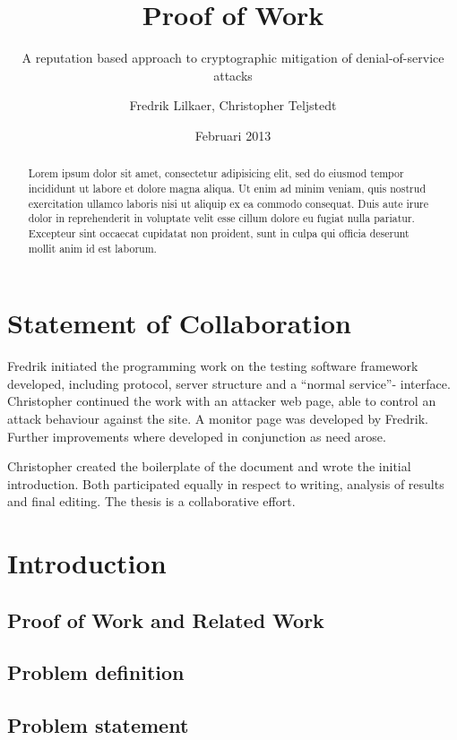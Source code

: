 \documentclass[a4paper,11pt]{kth-mag}
\title{Proof of Work}
\subtitle{A reputation based approach to cryptographic mitigation of denial-of-service attacks}
\author{Fredrik Lilkaer, Christopher Teljstedt}
\date{Februari 2013}
\begin{document}
\removepagenumbers
\maketitle
{}
\newpage
\begin{abstract}
Lorem ipsum dolor sit amet, consectetur adipisicing elit, sed do eiusmod tempor incididunt ut labore et dolore magna aliqua. Ut enim ad minim veniam, quis nostrud exercitation ullamco laboris nisi ut aliquip ex ea commodo consequat. Duis aute irure dolor in reprehenderit in voluptate velit esse cillum dolore eu fugiat nulla pariatur. Excepteur sint occaecat cupidatat non proident, sunt in culpa qui officia deserunt mollit anim id est laborum.
\end{abstract} 
\newpage
\section*{Statement of Collaboration}
Fredrik initiated the programming work on the testing software framework developed, including protocol, server structure and a ``normal service''- interface.
Christopher continued the work with an attacker web page, able to control an attack behaviour against the site. A monitor page was developed by Fredrik. Further improvements where developed in conjunction as need arose.

Christopher created the boilerplate of the document and wrote the initial introduction.
Both participated equally in respect to writing, analysis of results and final editing. The thesis is a collaborative effort.
\newpage  
\setcounter{section}{0}
\tableofcontents
\newpage
\section{Introduction}

\subsection*{Proof of Work and Related Work}

\subsection*{Problem definition}

\subsection*{Problem statement} %

\end{document}
